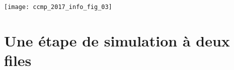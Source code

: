 %


\ifprof
\else
\begin{center}
	\texttt{[image: ccmp\_2017\_info\_fig\_03]}
\end{center}

\fi


\section{Une étape de simulation à deux files}

